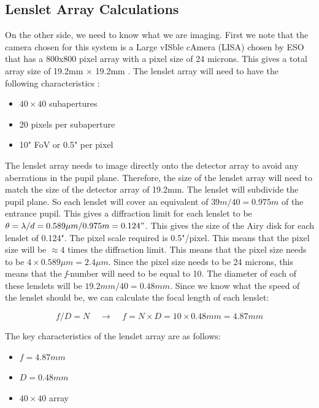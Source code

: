 \subsection{Lenslet Array Calculations}
\label{sec:lenslet_calc}
On the other side, we need to know what we are imaging.  First we note that the
camera chosen for this system is a Large vISble cAmera (LISA) chosen by ESO that has
a 800x800 pixel array with a pixel size of 24 microns.  This gives a total array
size of 19.2mm $\times$ 19.2mm \cite{SAPHIRA}.  The lenslet array will need to have
the following characteristics \cite{arcier}:

\begin{itemize}
    \item $40 \times 40$ subapertures
    \item 20 pixels per subaperture
    \item 10" FoV or 0.5" per pixel
\end{itemize}

The lenslet array needs to image directly onto the detector array to avoid any
aberrations in the pupil plane.  Therefore, the size of the lenslet array will need
to match the size of the detector array of 19.2mm.  The lenslet will subdivide the
pupil plane.  So each lenslet will cover an equivalent of $39m / 40 = 0.975 m$ of
the entrance pupil.  This gives a diffraction limit for each lenslet to be $\theta =
\lambda / d = 0.589\mu m / 0.975m = 0.124"$.  This gives the size of the Airy disk
for each lenslet of 0.124".  The pixel scale required is 0.5"/pixel.  This means
that the pixel size will be $\approx 4$ times the diffraction limit.  This means
that the pixel size needs to be $4 \times 0.589 \mu m = 2.4 \mu m$.  Since the pixel
size needs to be 24 microns, this means that the \textit{f}-number will need to be
equal to 10.  The diameter of each of these lenslets will be $19.2mm / 40 = 0.48mm$.
Since we know what the speed of the lenslet should be, we can calculate the focal
length of each lenslet:

\begin{equation}
    f/D = N \;\;\;\; \rightarrow \;\;\;\; f = N \times D = 10 \times 0.48mm = 4.87mm
\end{equation}

The key characteristics of the lenslet array are as follows:

\begin{itemize}
    \item $f = 4.87mm$
    \item $D = 0.48mm$
    \item $40 \times 40$ array
\end{itemize}


